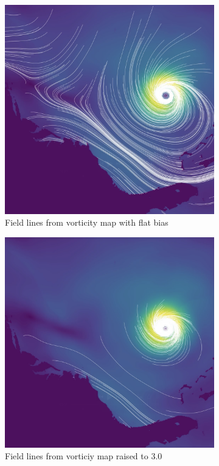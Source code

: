 \documentclass{article}
\begin{document}
\begin{figure}[h!]
    \centering
    \begin{subfigure}{0.43\textwidth}
        \centering
        \includegraphics[width=\textwidth, angle=270]{vort_result.png}
        \caption{Field lines from vorticity map with flat bias}
    \end{subfigure}
    \hfill
    \begin{subfigure}{0.43\textwidth}
        \centering
        \includegraphics[width=\textwidth, angle=270]{vort_result_3_0.png}
        \caption{Field lines from vorticiy map raised to 3.0}
    \end{subfigure}
    \caption{}
\end{figure}
\end{document}
